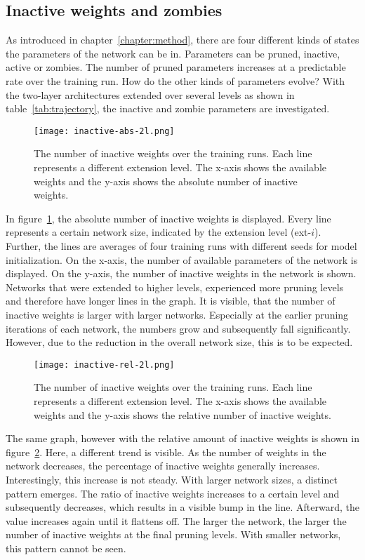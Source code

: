 \subsection{Inactive weights and zombies}
As introduced in chapter~\ref{chapter:method}, there are four different kinds of states the parameters of the network can be in.
Parameters can be pruned, inactive, active or zombies.
The number of pruned parameters increases at a predictable rate over the training run.
How do the other kinds of parameters evolve?
With the two-layer architectures extended over several levels as shown in table~\ref{tab:trajectory}, the inactive and zombie parameters are investigated.

\begin{figure}[ht]
    \centering
    \texttt{[image: inactive-abs-2l.png]}
    \caption[Inactive Weights during training runs, absolute]{
        The number of inactive weights over the training runs. 
        Each line represents a different extension level. 
        The x-axis shows the available weights and the y-axis shows the absolute number of inactive weights.
    }\label{fig:inactive-abs}
\end{figure}

In figure~\ref{fig:inactive-abs}, the absolute number of inactive weights is displayed.
Every line represents a certain network size, indicated by the extension level (ext-$i$).
Further, the lines are averages of four training runs with different seeds for model initialization.
On the x-axis, the number of available parameters of the network is displayed.
On the y-axis, the number of inactive weights in the network is shown.
Networks that were extended to higher levels, experienced more pruning levels and therefore have longer lines in the graph.
It is visible, that the number of inactive weights is larger with larger networks.
Especially at the earlier pruning iterations of each network, the numbers grow and subsequently fall significantly.
However, due to the reduction in the overall network size, this is to be expected.

\begin{figure}[ht]
    \centering
    \texttt{[image: inactive-rel-2l.png]}
    \caption[Inactive Weights during training runs, relative]{
        The number of inactive weights over the training runs. 
        Each line represents a different extension level. 
        The x-axis shows the available weights and the y-axis shows the relative number of inactive weights.
        }\label{fig:inactive-rel}
\end{figure}
The same graph, however with the relative amount of inactive weights is shown in figure~\ref{fig:inactive-rel}.
Here, a different trend is visible.
As the number of weights in the network decreases, the percentage of inactive weights generally increases.
Interestingly, this increase is not steady.
With larger network sizes, a distinct pattern emerges.
The ratio of inactive weights increases to a certain level and subsequently decreases, which results in a visible bump in the line.
Afterward, the value increases again until it flattens off.
The larger the network, the larger the number of inactive weights at the final pruning levels.
With smaller networks, this pattern cannot be seen.

